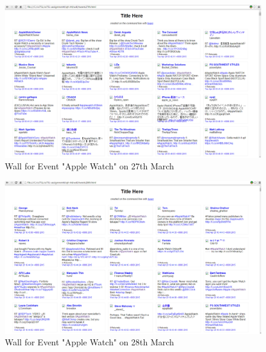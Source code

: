 \documentclass[12pt]{Report}
\begin{document}
\begin{figure}[ht]    
    \begin{center}
        \includegraphics[scale=0.60]{wall27th.png}
        \caption{Wall for Event "Apple Watch" on 27th March }
        \label{Wall for Event "Apple Watch" on 27th March}
    \end{center}
\end{figure}



\begin{figure}[ht]    
    \begin{center}
        \includegraphics[scale=0.60]{wall28th.png}
        \caption{Wall for Event "Apple Watch" on 28th March }
        \label{Wall for Event "Apple Watch" on 28th March}
    \end{center}
\end{figure}
\end{document}
